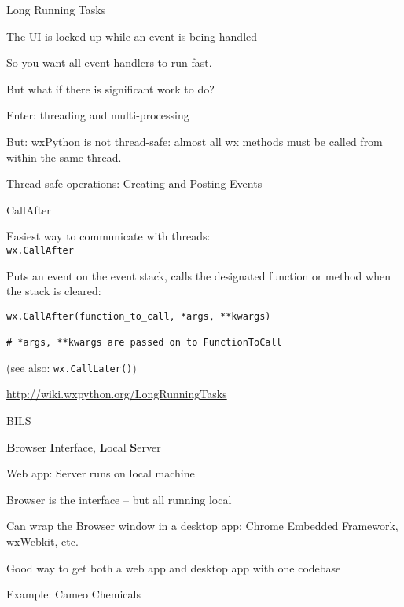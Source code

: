 \documentclass{beamer}
\begin{document}
\begin{frame}[fragile]{Long Running Tasks}

\vfill
{\Large The UI is locked up while an event is being handled}

\vfill
{\Large So you want all event handlers to run fast.}

\vfill
{\Large But what if there is significant work to do?}

\vfill
{\Large Enter: threading and multi-processing}

\vfill
{\Large But: wxPython is not thread-safe: almost all wx methods must be called from within the same thread.}

\vfill
{\Large Thread-safe operations: Creating and Posting Events}


\end{frame}

\begin{frame}[fragile]{CallAfter}

\vfill
{\Large Easiest way to communicate with threads:\\
 \verb`wx.CallAfter`}

\vfill
{\Large Puts an event on the event stack, calls the designated function or method when the stack is cleared:}

\begin{verbatim}
wx.CallAfter(function_to_call, *args, **kwargs)

# *args, **kwargs are passed on to FunctionToCall
\end{verbatim}

{\large (see also: \verb`wx.CallLater()`) }

\vfill
\url{http://wiki.wxpython.org/LongRunningTasks}

\end{frame}




\begin{frame}[fragile]{BILS}

\vfill
{\Large {\bf B}rowser {\bf I}nterface, {\bf L}ocal {\bf S}erver}
\vfill

\vfill
{\Large Web app: Server runs on local machine}
\vfill

\vfill
{\Large Browser is the interface -- but all running local}

\vfill
{\Large Can wrap the Browser window in a desktop app: Chrome Embedded Framework, wxWebkit, etc.}

\vfill
{\Large Good way to get both a web app and desktop app with one codebase}

\vfill
{\Large Example: Cameo Chemicals}

\end{frame}
\end{document}
